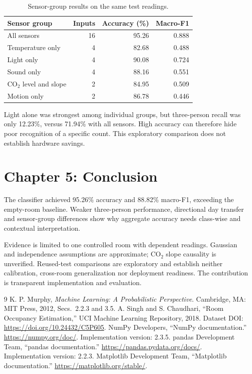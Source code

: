 \documentclass[12pt,a4paper]{article}
\begin{document}
\begin{table}[H]
\centering
\caption{Sensor-group results on the same test readings.}
\begin{tabular}{lrrr}
\toprule
\color{Navy}\bfseries Sensor group & \color{Navy}\bfseries Inputs & \color{Navy}\bfseries Accuracy (\%) & \color{Navy}\bfseries Macro-F1 \\
\midrule
All sensors & 16 & 95.26 & 0.888 \\
Temperature only & 4 & 82.68 & 0.488 \\
Light only & 4 & 90.08 & 0.724 \\
Sound only & 4 & 88.16 & 0.551 \\
CO$_2$ level and slope & 2 & 84.95 & 0.509 \\
Motion only & 2 & 86.78 & 0.446 \\
\bottomrule
\end{tabular}
\end{table}
Light alone was strongest among individual groups, but three-person recall was only 12.23\%, versus 71.94\% with all sensors. High accuracy can therefore hide poor recognition of a specific count. This exploratory comparison does not establish hardware savings.

\section{Chapter 5: Conclusion}
The classifier achieved 95.26\% accuracy and 88.82\% macro-F1, exceeding the empty-room baseline. Weaker three-person performance, directional day transfer and sensor-group differences show why aggregate accuracy needs class-wise and contextual interpretation.

Evidence is limited to one controlled room with dependent readings. Gaussian and independence assumptions are approximate; CO$_2$ slope causality is unverified. Reused-test comparisons are exploratory and establish neither calibration, cross-room generalization nor deployment readiness. The contribution is transparent implementation and evaluation.

\vspace{4pt}
\begingroup
\onehalfspacing
\renewcommand{\refname}{References}
{}
\begin{thebibliography}{9}
\setlength{\itemsep}{2pt}
\setlength{\parskip}{0pt}
 K. P. Murphy, \emph{Machine Learning: A Probabilistic Perspective}. Cambridge, MA: MIT Press, 2012, Secs.~2.2.3 and 3.5.
 A. Singh and S. Chaudhari, ``Room Occupancy Estimation,'' UCI Machine Learning Repository, 2018. Dataset DOI: \url{https://doi.org/10.24432/C5P605}.
 NumPy Developers, ``NumPy documentation.'' \url{https://numpy.org/doc/}. Implementation version: 2.3.5.
 pandas Development Team, ``pandas documentation.'' \url{https://pandas.pydata.org/docs/}. Implementation version: 2.2.3.
 Matplotlib Development Team, ``Matplotlib documentation.'' \url{https://matplotlib.org/stable/}.
\end{thebibliography}
\endgroup
\end{document}
